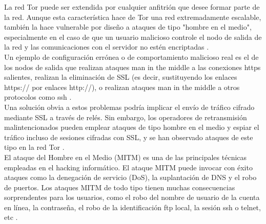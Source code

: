 \documentclass[10pt,letterpaper]{article}
\begin{document}
La red Tor puede ser extendida por cualquier anfitrión que desee formar parte de la red. Aunque esta característica hace de Tor una red extremadamente escalable, también la hace vulnerable por diseño a ataques de tipo "hombre en el medio", especialmente en el caso de que un usuario malicioso controle el nodo de salida de la red y las comunicaciones con el servidor no estén encriptadas \cite{cambiaso2019darknet}.\\

Un ejemplo de configuración errónea o de comportamiento malicioso real es el de los nodos de salida que realizan ataques man in the middle a las conexiones https salientes, realizan la eliminación de SSL (es decir, sustituyendo los enlaces https:// por enlaces http://), o realizan ataques man in the middle a otros protocolos como ssh \cite{Tor-badRelays}.\\

Una solución obvia a estos problemas podría implicar el envío de tráfico cifrado mediante SSL a través de relés. Sin embargo, los operadores de retransmisión malintencionados pueden emplear ataques de tipo hombre en el medio y espiar el tráfico incluso de sesiones cifradas con SSL, y se han observado ataques de este tipo en la red Tor \cite{chakravarty2015detection}.\\


El ataque del Hombre en el Medio (MITM) es una de las principales técnicas empleadas en el hacking informático. El ataque MITM puede invocar con éxito ataques como la denegación de servicio (DoS), la suplantación de DNS y el robo de puertos. Los ataques MITM de todo tipo tienen muchas consecuencias sorprendentes para los usuarios, como el robo del nombre de usuario de la cuenta en línea, la contraseña, el robo de la identificación ftp local, la sesión ssh o telnet, etc \cite{nayak2010different}.


\nocite{chaum1981untraceable,wang2011potential,Tor,I2P,zantout2011i2p,Freenetproject,dingledine2004tor,danezis2008survey,
conrad2014survey,montieri2017anonymity,JonDonym, freedman2002tarzan, rennhard2002introducing,Mixmaster,AntsP2P,
Mixminion, alese2012comparative, rabah2005theory, berta2003implementing,diffie1976new,merkle1978secure,nath2010symmetric,schneier2007applied,adrian2015imperfect,rivest1978method,
brent2000recent,silverman1987multiple,shor1994algorithms,hecht2014aportes,elgamal1985public,shor1999polynomial,ding2005rainbow,
bernstein2015sphincs,alkim2016post,overbeck2009code,de2003declaracion,opennet2006opennet,syverson2004tor,jrandom2010i2p,
mccoy2008shining,panchenko2012improving,sanatinia2017off,noubir2016honey,ccalicskan2015technical,winter2014spoiled,
alsabah2016performance,cambiaso2019darknet,chakravarty2015detection,nayak2010different,Mute}





\end{document}
